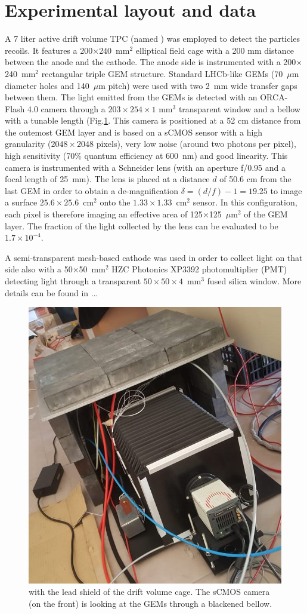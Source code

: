 \documentclass[12pt]{iopart}
\begin{document}
 \section{Experimental layout and data }
 A 7 liter active drift volume TPC  (named \lemon  \cite{paperBTF} ) was employed to detect the particles recoils. It 
features   a  200$\times$240~mm$^2$ elliptical field cage with a 200 mm distance between the anode and the cathode. The anode side is instrumented with a 200$\times$240~mm$^2$ rectangular triple  GEM structure.
Standard LHCb-like \cite{bib:thesis} GEMs  (70~$\mu$m diameter holes and 140~$\mu$m pitch) were used with two 2~mm wide transfer gaps between them. The light emitted from the GEMs is detected with   an ORCA-Flash 4.0 camera \cite{ORCAcamera} through a  $203\times254\times1$ mm$^3$ transparent window and a  bellow with a tunable length (Fig.\ref{fig:LemonShielded}.  This camera is positioned  at a 52 cm  distance from the outemost  GEM layer and is based on a sCMOS sensor with a high granularity ($2048\times2048$ pixels), very low noise (around two photons per pixel), high sensitivity (70\%  quantum efficiency at  600~nm) and good linearity. This camera is instrumented with a Schneider lens (with an aperture f/0.95 and a focal length of 25~mm). The lens is placed at a distance $d$ of 50.6 cm from the last GEM
in order to obtain a de-magnification
$\delta = (d/f) - 1 = 19.25$ to
image a surface $25.6 \times 25.6$~cm$^2$ onto the
$1.33 \times 1.33$~cm$^2$ sensor.
In this configuration, each pixel
 is therefore imaging  an effective area of 125$\times$125~$\mu$m$^2$ of the GEM layer. The fraction of the light collected by the lens can be evaluated \cite{bib:jinst_orange1} to be $1.7 \times 10^{-4}$.

A semi-transparent mesh-based cathode was used in order to collect light on that side also with a 50$\times$50~mm$^2$ HZC Photonics XP3392 photomultiplier \cite{PMTPhotonics} (PMT) detecting light through a transparent $50\times50\times4$~mm$^3$ fused silica window. More details can be found in ...


 
\begin{figure}[ht]
	\centering
	\includegraphics[width=0.45\linewidth]{LEMON-Shielded.jpg}
  	\caption{\lemon with the lead shield of the  drift volume cage. The sCMOS camera (on the front) is looking at the GEMs through a blackened bellow.}
  	\label{fig:LemonShielded}
\end{figure}
\end{document}
